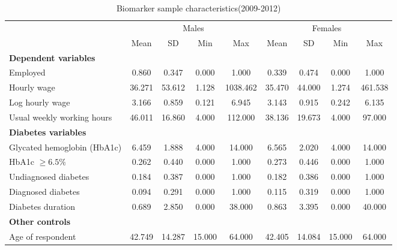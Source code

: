 \documentclass[12pt,english,british]{article}
\newcommand{\sym}[1]{\rlap{#1}}%
\begin{document}
\begin{table}[h!]
\caption{\label{tab:Biomarker-sample-characteristics}Biomarker sample characteristics(2009-2012)}
\begin{center}
\begin{adjustbox}{max width=\textwidth}
{ \def\sym#1{\ifmmode^{#1}\else\(^{#1}\)\fi} \begin{tabular}{l*{2}{cccc}}
\toprule
                    &\multicolumn{4}{c}{Males}                          &\multicolumn{4}{c}{Females}                        \\
                    &        Mean&          SD&         Min&         Max&        Mean&          SD&         Min&         Max\\
\midrule
\textbf{Dependent variables} &&&&&&&& \\
Employed            &       0.860&       0.347&       0.000&       1.000&       0.339&       0.474&       0.000&       1.000\\
Hourly wage            &      36.271&      53.612&       1.128&    1038.462&      35.470&      44.000&       1.274&     461.538\\
Log hourly wage     &       3.166&       0.859&       0.121&       6.945&       3.143&       0.915&       0.242&       6.135\\
Usual weekly working hours&      46.011&      16.860&       4.000&     112.000&      38.136&      19.673&       4.000&      97.000\\
\textbf{Diabetes variables} &&&&&&&& \\
Glycated hemoglobin (HbA1c)&       6.459&       1.888&       4.000&      14.000&       6.565&       2.020&       4.000&      14.000\\
HbA1c $\geq 6.5\%$&       0.262&       0.440&       0.000&       1.000&       0.273&       0.446&       0.000&       1.000\\
Undiagnosed diabetes&       0.184&       0.387&       0.000&       1.000&       0.182&       0.386&       0.000&       1.000\\
Diagnosed diabetes  &       0.094&       0.291&       0.000&       1.000&       0.115&       0.319&       0.000&       1.000\\
Diabetes duration   &       0.689&       2.850&       0.000&      38.000&       0.863&       3.395&       0.000&      40.000\\
\textbf{Other controls} &&&&&&&& \\
Age of respondent   &      42.749&      14.287&      15.000&      64.000&      42.405&      14.084&      15.000&      64.000\\

\end{tabular}}
\end{adjustbox}
\end{center}
\end{table}
\end{document}
